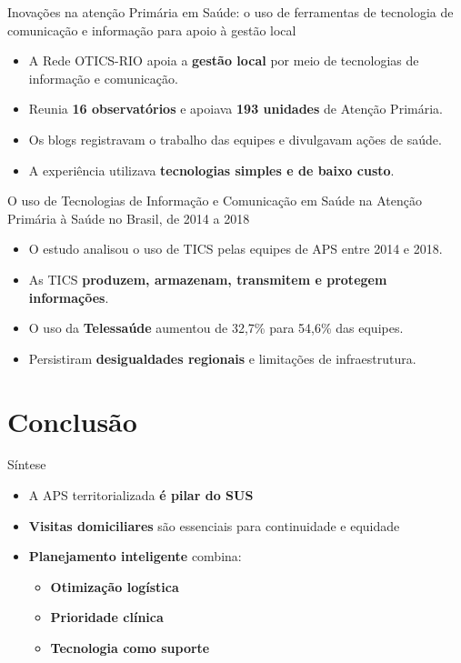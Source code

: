 ﻿\documentclass[aspectratio=169]{beamer}
\begin{document}
\begin{frame}{Inovações na atenção Primária em Saúde: o uso de ferramentas de tecnologia de comunicação e informação para apoio à gestão local}
  \begin{itemize}
    \item A Rede OTICS-RIO apoia a \textbf{gestão local} por meio de tecnologias de informação e comunicação.
    \item Reunia \textbf{16 observatórios} e apoiava \textbf{193 unidades} de Atenção Primária.
    \item Os blogs registravam o trabalho das equipes e divulgavam ações de saúde.
    \item A experiência utilizava \textbf{tecnologias simples e de baixo custo}.
  \end{itemize}
\end{frame}

\begin{frame}{O uso de Tecnologias de Informação e Comunicação em Saúde 
na Atenção Primária à Saúde no Brasil, de 2014 a 2018}
  \begin{itemize}
    \item O estudo analisou o uso de TICS pelas equipes de APS entre 2014 e 2018.
    \item As TICS \textbf{produzem, armazenam, transmitem e protegem informações}.
    \item O uso da \textbf{Telessaúde} aumentou de 32,7\% para 54,6\% das equipes.
    \item Persistiram \textbf{desigualdades regionais} e limitações de infraestrutura.
  \end{itemize}
\end{frame}


\section{Conclus\~ao}

\begin{frame}{S\'intese}
  \begin{itemize}
    \item A APS territorializada \textbf{é pilar do SUS}
    \item \textbf{Visitas domiciliares} são essenciais para continuidade e equidade
    \item \textbf{Planejamento inteligente} combina:
      \begin{itemize}
        \item \textbf{Otimiza\c{c}\~ao log\'istica}
        \item \textbf{Prioridade cl\'inica}
        \item \textbf{Tecnologia como suporte}
      \end{itemize}
  \end{itemize}
\end{frame}
\end{document}
